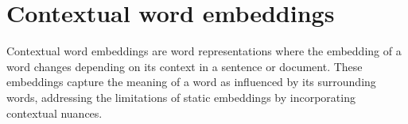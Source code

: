 \documentclass[letterpaper,11pt,english]{sphinxmanual}
\begin{document}
\begin{sphinxVerbatim}[commandchars=\\\{\}]
     \PYG{p}{]}
\PYG{p}{[}       
        \PYG{p}{]}\PYG{p}{]}
          
\end{sphinxVerbatim}


\section{Contextual word embeddings}
\label{\detokenize{embedding:contextual-word-embeddings}}
\sphinxAtStartPar
Contextual word embeddings are word representations where the embedding of a word
changes depending on its context in a sentence or document. These embeddings capture
the meaning of a word as influenced by its surrounding words, addressing the limitations
of static embeddings by incorporating contextual nuances.
\end{document}
